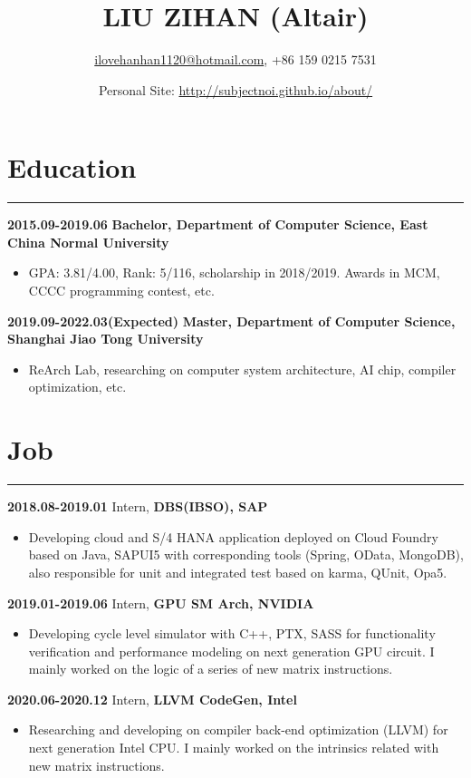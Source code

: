 \documentclass[twocolumn, 9pt]{article}
\title{\textbf{\TNR LIU ZIHAN (Altair)}}
\author{\url{ilovehanhan1120@hotmail.com}, +86 159 0215 7531}
\date{Personal Site: \url{http://subjectnoi.github.io/about/}}
\begin{document}
		\maketitle

		\section*{{\EBITC Education}\vspace{-1.2em}}
		\noindent
		\rule[0.01em]{\linewidth}{0.01em}
		\textbf{2015.09-2019.06} \hfill \textbf{Bachelor, Department of Computer Science, East China Normal University}
		\begin{itemize}
		\item GPA: 3.81/4.00, Rank: 5/116, scholarship in 2018/2019. Awards in MCM, CCCC programming contest, etc.
		\end{itemize}
		\textbf{2019.09-2022.03(Expected)} \hfill \textbf{Master, Department of Computer Science, Shanghai Jiao Tong University}
		\begin{itemize}
		\item ReArch Lab, researching on computer system architecture, AI chip, compiler optimization, etc. 
		\end{itemize}

		\section*{{\EBITC Job}\vspace{-1.2em}}
		\noindent
		\rule[0.01em]{\linewidth}{0.01em}
		\textbf{2018.08-2019.01} \hfill Intern, \textbf{DBS(IBSO), SAP}
		\begin{itemize}
		\item Developing cloud and {\courier S/4 HANA} application deployed on {\courier Cloud Foundry} based on {\courier Java, SAPUI5} with corresponding tools ({\courier Spring, OData, MongoDB}), also responsible for unit and integrated test based on {\courier karma, QUnit, Opa5}.
		\end{itemize}
		\textbf{2019.01-2019.06} \hfill Intern, \textbf{GPU SM Arch, NVIDIA}
		\begin{itemize}
		\item Developing cycle level simulator with {\courier C++, PTX, SASS} for functionality verification and performance modeling on next generation GPU circuit. I mainly worked on the logic of a series of new matrix instructions.
        \end{itemize}
        \textbf{2020.06-2020.12} \hfill Intern, \textbf{LLVM CodeGen, Intel}
        \begin{itemize}
        \item Researching and developing on compiler back-end optimization ({\courier LLVM}) for next generation Intel CPU. I mainly worked on the intrinsics related with new matrix instructions. 
		\end{itemize}
		
\end{document}
